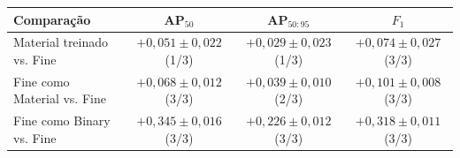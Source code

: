 \begin{tabular}{lccc}
\toprule
Comparação & AP$_{50}$ & AP$_{50:95}$ & $F_1$ \\
\midrule
Material treinado vs. Fine & $+0{,}051\pm0{,}022$ (1/3) & $+0{,}029\pm0{,}023$ (1/3) & $+0{,}074\pm0{,}027$ (3/3) \\
Fine como Material vs. Fine & $+0{,}068\pm0{,}012$ (3/3) & $+0{,}039\pm0{,}010$ (2/3) & $+0{,}101\pm0{,}008$ (3/3) \\
Fine como Binary vs. Fine & $+0{,}345\pm0{,}016$ (3/3) & $+0{,}226\pm0{,}012$ (3/3) & $+0{,}318\pm0{,}011$ (3/3) \\
\bottomrule
\end{tabular}
